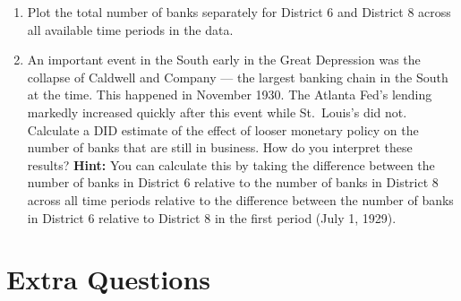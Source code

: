 \documentclass[
  letterpaper,
  DIV=11,
  numbers=noendperiod]{scrreprt}
\begin{document}
\begin{enumerate}
  \begin{enumerate}
  \def\labelenumii{\alph{enumii})}
  \item
    Plot the total number of banks separately for District 6 and
    District 8 across all available time periods in the data.
  \item
    An important event in the South early in the Great Depression was
    the collapse of Caldwell and Company --- the largest banking chain
    in the South at the time. This happened in November 1930. The
    Atlanta Fed's lending markedly increased quickly after this event
    while St.~Louis's did not. Calculate a DID estimate of the effect of
    looser monetary policy on the number of banks that are still in
    business. How do you interpret these results? \textbf{Hint:} You can
    calculate this by taking the difference between the number of banks
    in District 6 relative to the number of banks in District 8 across
    all time periods relative to the difference between the number of
    banks in District 6 relative to District 8 in the first period (July
    1, 1929).
  \end{enumerate}
\end{enumerate}

\section{Extra Questions}\label{extra-questions-5}
\end{document}
